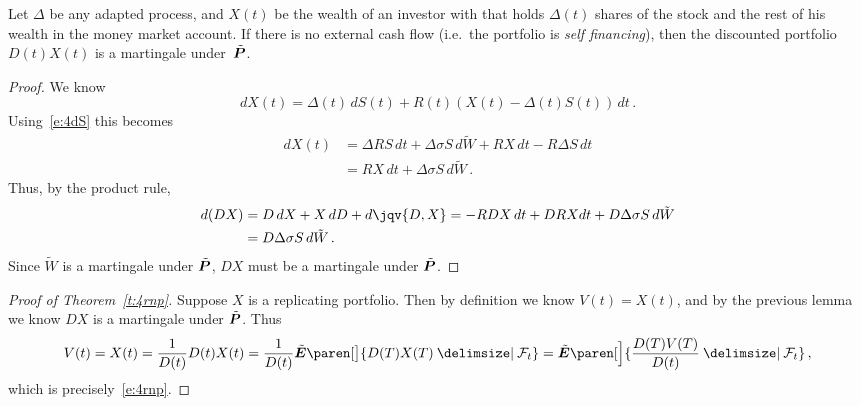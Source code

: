 \begin{lemma}
  Let $\Delta$ be any adapted process, and $X(t)$ be the wealth of an investor with that holds $\Delta(t)$ shares of the stock and the rest of his wealth in the money market account.
  If there is no external cash flow (i.e.\ the portfolio is \emph{self financing}), then the discounted portfolio $D(t) X(t)$ is a martingale under~$\tilde\P$.
\end{lemma}
\begin{proof}
  We know 
  \begin{equation*}
    dX(t) = \Delta(t) \, dS(t) + R(t) (X(t) - \Delta(t) S(t)) \, dt\,.
  \end{equation*}
  Using~\eqref{e:4dS} this becomes
  \begin{align*}
    dX(t) &= \Delta R S \, dt + \Delta \sigma S \, d\tilde W
      + R X \, dt - R \Delta S \, dt
    \\
      &= RX \, dt + \Delta \sigma S \, d\tilde W\,.
  \end{align*}
  Thus, by the product rule,
  \begin{align*}
    d(DX) &= D \, dX + X \, dD + d\jqv{D,X}
      = -R D X \, dt + D  RX dt + D \Delta \sigma S \, d\tilde W
    \\
      &= D \Delta \sigma S \, d\tilde W\,.
  \end{align*}
  Since $\tilde W$ is a martingale under $\tilde\P$, $DX$ must be a martingale under $\tilde\P$.
\end{proof}

\begin{proof}[Proof of Theorem~\ref{t:4rnp}]
  Suppose $X$ is a replicating portfolio.
  Then by definition we know $V(t) = X(t)$, and by the previous lemma we know $DX$ is a martingale under $\tilde\P$.
  Thus
  \begin{equation*}
    V(t)
      = X(t)
      = \frac{1}{D(t)} D(t) X(t)
      = \frac{1}{D(t)} \tilde\E\paren[\big]{ D(T) X(T) \given \mathcal F_t }
      = \tilde\E\paren[\Big]{
	  \frac{D(T) V(T)}{D(t)} \given \mathcal F_t }\,,
  \end{equation*}
  which is precisely~\eqref{e:4rnp}.
\end{proof}

